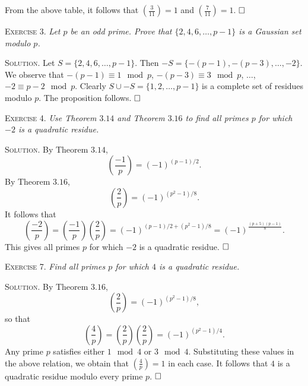 \documentclass[11pt, leqno]{article}
\newcommand{\done}{\ensuremath{\hfill\square}}
\begin{document}
From the above table, it follows that $\left(\frac{3}{11}\right) = 1$ and $\left(\frac{7}{11}\right) = 1$. \done

\textsc{Exercise 3}. \emph{Let $p$ be an odd prime. Prove that $\{2, 4, 6, \ldots, p-1\}$ is a Gaussian set modulo $p$.}

\textsc{Solution}. Let $S=\{2, 4, 6, \ldots, p-1\} $. Then $-S = \{-(p-1), -(p-3), \ldots, -2\}$. We observe that $-(p-1) \equiv 1 \mod p$, $-(p-3) \equiv 3 \mod p$, $\ldots$, $-2 \equiv p-2 \mod p$. Clearly $S\cup -S = \{1, 2, \ldots, p-1\}$ is a complete set of residues modulo $p$. The proposition follows. \done

\textsc{Exercise 4}. \emph{Use Theorem $3.14$ and Theorem $3.16$ to find all primes $p$ for which $-2$ is a quadratic residue.}

\textsc{Solution}. By Theorem $3.14$, 
\begin{displaymath}
\left( \frac{-1}{p} \right) = (-1)^{(p-1)/2}.
\end{displaymath}
By Theorem $3.16$, 
\begin{displaymath}
\left( \frac{2}{p} \right) = (-1)^{(p^2-1)/8}.
\end{displaymath}
It follows that 
\begin{displaymath}
\left( \frac{-2}{p} \right) = \left( \frac{-1}{p} \right) \left( \frac{2}{p} \right) = (-1)^{(p-1)/2 + (p^2-1)/8} = (-1)^{\frac{(p+5)(p-1)}{8}}.
\end{displaymath}
This gives all primes $p$ for which $-2$ is a quadratic residue. \done


\textsc{Exercise 7}. \emph{Find all primes $p$ for which $4$ is a quadratic residue.}

\textsc{Solution}. By Theorem $3.16$, 
\begin{displaymath}
\left( \frac{2}{p} \right) = (-1)^{(p^2-1)/8},
\end{displaymath}
so that 
\begin{displaymath}
\left( \frac{4}{p} \right) = \left( \frac{2}{p} \right) \left( \frac{2}{p} \right) = (-1)^{(p^2-1)/4}.
\end{displaymath}
Any prime $p$ satisfies either $1 \mod 4$ or $3 \mod 4$. Substituting these values in the above relation, we obtain that $\left( \frac{4}{p} \right) = 1$ in each case. It follows that $4$ is a quadratic residue modulo every prime $p$. \done
\end{document}
